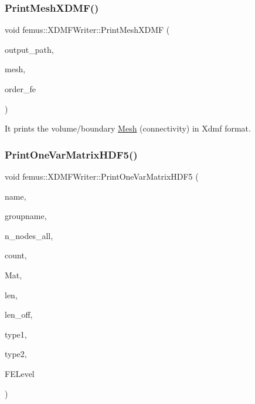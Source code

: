 \subsubsection{\texorpdfstring{Print\+Mesh\+X\+D\+M\+F()}{PrintMeshXDMF()}}
{\footnotesize\ttfamily void femus\+::\+X\+D\+M\+F\+Writer\+::\+Print\+Mesh\+X\+D\+MF (\begin{DoxyParamCaption}\item[{const std\+::string}]{output\+\_\+path,  }\item[{const \mbox{\hyperlink{classfemus_1_1_multi_level_mesh_two}{Multi\+Level\+Mesh\+Two}} \&}]{mesh,  }\item[{const \mbox{\hyperlink{_typedefs_8hpp_a91ad9478d81a7aaf2593e8d9c3d06a14}{uint}}}]{order\+\_\+fe }\end{DoxyParamCaption})\hspace{0.3cm}{\ttfamily [static]}}



It prints the volume/boundary \mbox{\hyperlink{classfemus_1_1_mesh}{Mesh}} (connectivity) in Xdmf format. 

\mbox{\label{classfemus_1_1_x_d_m_f_writer_aa58487f12b6c52bb458430f3cabdab3f}} 
\subsubsection{\texorpdfstring{Print\+One\+Var\+Matrix\+H\+D\+F5()}{PrintOneVarMatrixHDF5()}}
{\footnotesize\ttfamily void femus\+::\+X\+D\+M\+F\+Writer\+::\+Print\+One\+Var\+Matrix\+H\+D\+F5 (\begin{DoxyParamCaption}\item[{const std\+::string \&}]{name,  }\item[{const std\+::string \&}]{groupname,  }\item[{\mbox{\hyperlink{_typedefs_8hpp_a91ad9478d81a7aaf2593e8d9c3d06a14}{uint}} $\ast$$\ast$}]{n\+\_\+nodes\+\_\+all,  }\item[{int}]{count,  }\item[{int $\ast$}]{Mat,  }\item[{int $\ast$}]{len,  }\item[{int $\ast$}]{len\+\_\+off,  }\item[{int}]{type1,  }\item[{int}]{type2,  }\item[{int $\ast$}]{F\+E\+Level }\end{DoxyParamCaption})\hspace{0.3cm}{\ttfamily [static]}}

